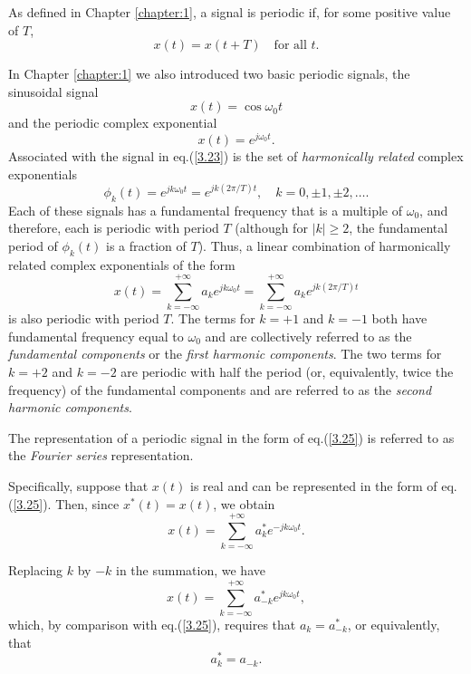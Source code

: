 \documentclass[a4paper,twoside]{book}
\begin{document}
As defined in Chapter \ref{chapter:1}, a signal is periodic if, for some positive value of $T$,
\begin{equation}
    x(t) = x(t + T)\quad\text{for all }t.
    \label{3.21}
\end{equation}

In Chapter \ref{chapter:1} we also introduced two basic periodic signals, the sinusoidal signal
\begin{equation}
    x(t)=\cos\omega_0t
    \label{3.22}
\end{equation}
and the periodic complex exponential
\begin{equation}
    x(t)=e^{j\omega_0t}.
    \label{3.23}
\end{equation}
Associated with the signal in eq.\;(\ref{3.23}) is the set of \textit{harmonically related} complex exponentials
\begin{equation}
    \phi_k(t) = e^{jk\omega_0t} = e^{jk(2\pi/T)t},\quad k = 0,\pm1,\pm2,\ldots.
    \label{3.24}
\end{equation}
Each of these signals has a fundamental frequency that is a multiple of $\omega_0$, and therefore, each is periodic with period $T$ (although for $|k|\ge 2$, the fundamental period of $\phi_k(t)$ is a fraction of $T$). Thus, a linear combination of harmonically related complex exponentials of the form
\begin{equation}
    x(t) = \sum_{k=-\infty}^{+\infty}a_ke^{jk\omega_0t} = \sum_{k=-\infty}^{+\infty}a_ke^{jk(2\pi/T)t}
    \label{3.25}
\end{equation}
is also periodic with period $T$. The terms for $k=+1$ and $k=-1$ both have fundamental frequency equal to $\omega_0$ and are collectively referred to as the \textit{fundamental components} or the \textit{first harmonic components}. The two terms for $k=+2$ and $k=-2$ are periodic with half the period (or, equivalently, twice the frequency) of the fundamental components and are referred to as the \textit{second harmonic components}.

The representation of a periodic signal in the form of eq.\;(\ref{3.25}) is referred to as the \textit{Fourier series} representation.

Specifically, suppose that $x(t)$ is real and can be represented in the form of eq.\;(\ref{3.25}). Then, since $x^{*}(t)=x(t)$, we obtain $$x(t) = \sum_{k=-\infty}^{+\infty}a_{k}^{*}e^{-jk\omega_{0}t}.$$

Replacing $k$ by $-k$ in the summation, we have $$x(t) = \sum_{k=-\infty}^{+\infty}a_{-k}^{*}e^{jk\omega_{0}t},$$ which, by comparison with eq.\;(\ref{3.25}), requires that $a_k=a_{-k}^*$, or equivalently, that
\begin{equation}
    a_k^*=a_{-k}.
    \label{3.29}
\end{equation}
\end{document}
